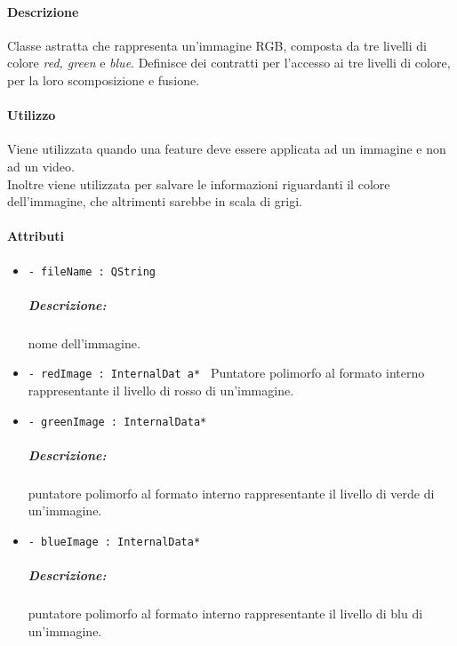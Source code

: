 \paragraph{Descrizione \\}
Classe astratta che rappresenta un'immagine RGB, composta da tre livelli di colore \textit{red, green} e \textit{blue}. Definisce dei contratti per l'accesso ai tre livelli di colore, per la loro scomposizione e fusione.

\paragraph{Utilizzo \\}
Viene utilizzata quando una feature\g{}  deve essere applicata ad un immagine e non ad un video.
\\Inoltre viene utilizzata per salvare le informazioni riguardanti il colore dell'immagine, che altrimenti sarebbe in scala di grigi.

\paragraph{Attributi \\}
	\begin{itemize}
		\item \color{teal}\verb!- fileName : QString !
		\color{black} 
		\subparagraph{Descrizione:} nome dell'immagine.
		
		\item \color{teal}\verb!- redImage : InternalDat a* !
		\color{black} Puntatore polimorfo al formato interno rappresentante il livello di rosso di un'immagine.

		\item \color{teal}\verb!- greenImage : InternalData* !
			\color{black}
			\subparagraph{Descrizione:} puntatore polimorfo al formato interno rappresentante il livello di verde di un'immagine.
			\
			
		\item \color{teal}\verb!- blueImage : InternalData* !
		\color{black} 
		\subparagraph{Descrizione:} puntatore polimorfo al formato interno rappresentante il livello di blu di un'immagine.

	\end{itemize}

